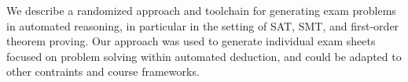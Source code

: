 We describe a randomized approach and toolchain for generating exam problems in
automated reasoning, in particular in the setting of SAT, SMT, and first-order theorem
proving. Our approach was used to generate individual exam sheets focused on
problem solving within automated deduction, and could be adapted to other
contraints and course frameworks.
